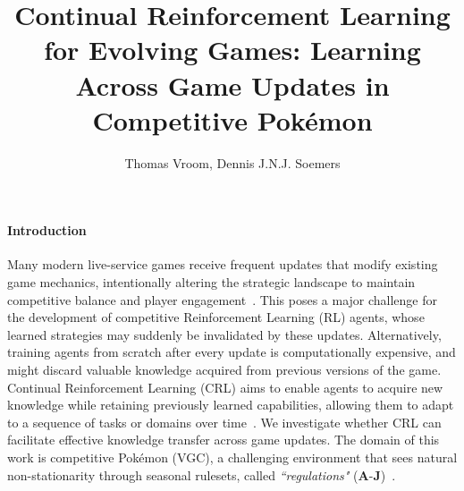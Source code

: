 \documentclass{llncs}
\begin{document}
\title{Continual Reinforcement Learning for Evolving Games: Learning Across Game Updates in Competitive Pokémon}
\author{Thomas Vroom, Dennis J.N.J. Soemers}
\maketitle

\paragraph{Introduction}
Many modern live-service games receive frequent updates that modify existing game mechanics, intentionally altering the strategic landscape to maintain competitive balance and player engagement~\cite{chitayat2023gameupdates}.
This poses a major challenge for the development of competitive Reinforcement Learning (RL) agents, whose learned strategies may suddenly be invalidated by these updates.
Alternatively, training agents from scratch after every update is computationally expensive, and might discard valuable knowledge acquired from previous versions of the game.
Continual Reinforcement Learning (CRL) aims to enable agents to acquire new knowledge while retaining previously learned capabilities, allowing them to adapt to a sequence of tasks or domains over time~\cite{wang2024cl}.
We investigate whether CRL can facilitate effective knowledge transfer across game updates.
The domain of this work is competitive Pokémon (VGC), a challenging environment that sees natural non-stationarity through seasonal rulesets, called \textit{``regulations"} (\textbf{A}-\textbf{J})~\cite{angliss2025vgc,vgc-rules-regulations}.
\end{document}
